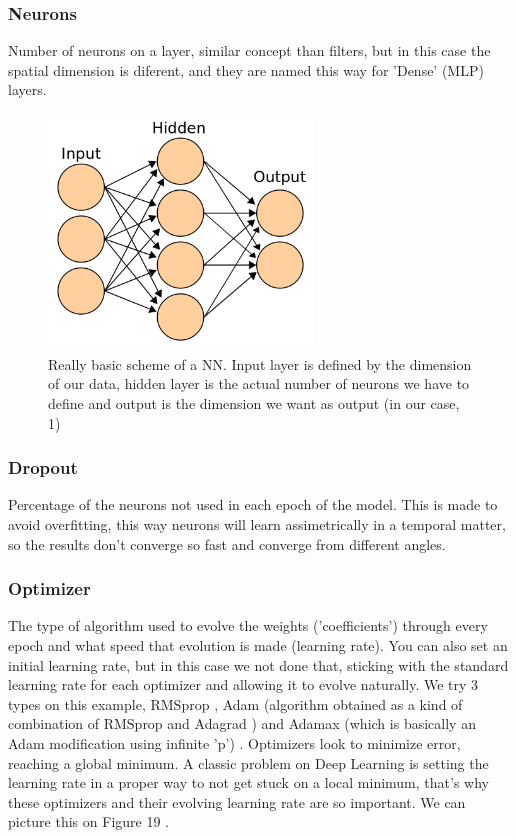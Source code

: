 \documentclass[openany]{article}
\begin{document}
\subsubsection*{Neurons}

Number of neurons on a layer, similar concept than filters, but in this case the spatial dimension is diferent, and they are named this way for 'Dense' (MLP) layers.

\begin{figure}[!h]
    \centering
    \includegraphics[width=7cm]{neurons.png}
    \caption{Really basic scheme of a NN. Input layer is defined by the dimension of our data, hidden layer is the actual number of neurons we have to define and output is the dimension we want as output (in our case, 1) }
    \label{fig:my_label}
\end{figure}

\subsubsection*{Dropout}

Percentage of the neurons not used in each epoch of the model. This is made to avoid overfitting, this way neurons will learn assimetrically in a temporal matter, so the results don't converge so fast and converge from different angles.

\subsubsection*{Optimizer}

The type of algorithm used to evolve the weights ('coefficients') through every epoch and what speed that evolution is made (learning rate). You can also set an initial learning rate, but in this case we not done that, sticking with the standard learning rate for each optimizer and allowing it to evolve naturally. We try 3 types on this example, RMSprop \cite{RMSprop}, Adam (algorithm obtained as a kind of combination of RMSprop and Adagrad \cite{duchi2011adaptive}) and Adamax (which is basically an Adam modification using infinite 'p') \cite{Adam}. Optimizers look to minimize error, reaching a global minimum. A classic problem on Deep Learning is setting the learning rate in a proper way to not get stuck on a local minimum, that's why these optimizers and their evolving learning rate are so important. We can picture this on Figure 19 \cite{gradient}.
\end{document}
